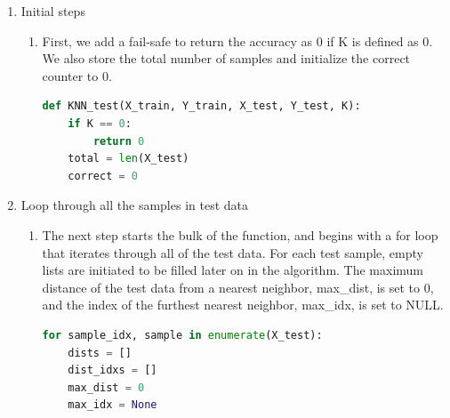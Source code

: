 \documentclass[11pt]{article}
\theoremstyle{definition}
\begin{document}
\begin{enumerate}
 \item Initial steps
 \begin{enumerate}
    \item First, we add a fail-safe to return the accuracy as 0 if K is defined as 0. We also store the \textsf{total} number of samples and initialize the \textsf{correct} counter to 0.
\begin{lstlisting}[language=python, frame=single]
def KNN_test(X_train, Y_train, X_test, Y_test, K):
    if K == 0:
        return 0
    total = len(X_test)
    correct = 0
\end{lstlisting}    
    \end{enumerate}
 \item Loop through all the samples in test data
 \begin{enumerate}
     \item The next step starts the bulk of the function, and begins with a \textsf{for loop} that iterates through all of the test data. For each test sample, empty lists are initiated to be filled later on in the algorithm. The maximum distance of the test data from a nearest neighbor, \textsf{max\_dist}, is set to 0, and the index of the furthest nearest neighbor, \textsf{max\_idx}, is set to NULL. 
\begin{lstlisting}[language=python, frame=single]
for sample_idx, sample in enumerate(X_test):
    dists = []
    dist_idxs = []
    max_dist = 0
    max_idx = None
\end{lstlisting}


\end{enumerate}
\end{enumerate}
\end{document}
